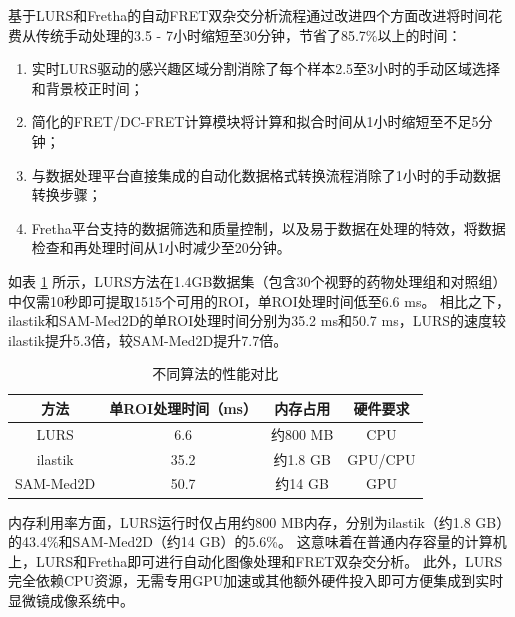 基于LURS和Fretha的自动FRET双杂交分析流程通过改进四个方面改进将时间花费从传统手动处理的3.5 - 7小时缩短至30分钟，节省了85.7\%以上的时间：
\begin{enumerate}
  \item 实时LURS驱动的感兴趣区域分割消除了每个样本2.5至3小时的手动区域选择和背景校正时间；
  \item 简化的FRET/DC-FRET计算模块将计算和拟合时间从1小时缩短至不足5分钟；
  \item 与数据处理平台直接集成的自动化数据格式转换流程消除了1小时的手动数据转换步骤；
  \item Fretha平台支持的数据筛选和质量控制，以及易于数据在处理的特效，将数据检查和再处理时间从1小时减少至20分钟。
\end{enumerate}

如表 \ref{tab:性能对比} 所示，LURS方法在1.4GB数据集（包含30个视野的药物处理组和对照组）中仅需10秒即可提取1515个可用的ROI，单ROI处理时间低至6.6 ms。
相比之下，ilastik和SAM-Med2D的单ROI处理时间分别为35.2 ms和50.7 ms，LURS的速度较ilastik提升5.3倍，较SAM-Med2D提升7.7倍。
\begin{table}[htbp]
  \centering
  \caption{不同算法的性能对比}
  \begin{tabular}{cccc}
  \toprule[1.5pt]
  方法 & 单ROI处理时间（ms） & 内存占用 & 硬件要求 \\
  \midrule
  LURS & 6.6 & 约800 MB & CPU \\
  ilastik & 35.2 & 约1.8 GB & GPU/CPU \\
  SAM-Med2D & 50.7 & 约14 GB & GPU \\
  \bottomrule[1.5pt]
  \end{tabular}
  \label{tab:性能对比}
\end{table}

内存利用率方面，LURS运行时仅占用约800 MB内存，分别为ilastik（约1.8 GB）的43.4\%和SAM-Med2D（约14 GB）的5.6\%。
这意味着在普通内存容量的计算机上，LURS和Fretha即可进行自动化图像处理和FRET双杂交分析。
此外，LURS完全依赖CPU资源，无需专用GPU加速或其他额外硬件投入即可方便集成到实时显微镜成像系统中。  

